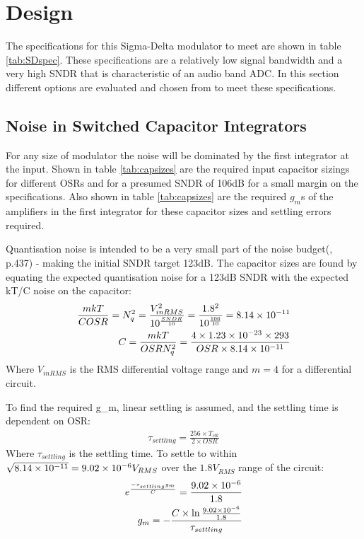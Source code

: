 \section{Design}
\label{Design}
The specifications for this Sigma-Delta modulator to meet are shown in table \ref{tab:SDspec}.
These specifications are a relatively low signal bandwidth and a very high SNDR that is characteristic of an audio band ADC.
In this section different options are evaluated and chosen from to meet these specifications.



\subsection{Noise in  Switched Capacitor Integrators}
\label{Design:noise}
For any size of modulator the noise will be dominated by the first integrator at the input\cite{Henderson2013}.
Shown in table \ref{tab:capsizes} are the required input capacitor sizings for different OSRs and for a presumed SNDR of 106dB for a small margin on the specifications.
Also shown in table \ref{tab:capsizes} are the required $g_{m}$s of the amplifiers in the first integrator for these capacitor sizes and settling errors required.

Quantisation noise is intended to be a very small part of the noise budget(\cite{Steensgaard2004}, p.437) - making the initial SNDR target 123dB.
The capacitor sizes are found by equating the expected quantisation noise for a 123dB SNDR with the expected kT/C noise on the capacitor:
\begin{align}
    \frac{m k T}{C OSR} = N_{q}^{2} = \frac{V_{inRMS}^{2}}{10^{\frac{SNDR}{10}}} = \frac{1.8^{2}}{10^{\frac{106}{10}}} = 8.14\times 10^{-11} \\
    C = \frac{m k T}{OSR N_{q}^{2}} = \frac{4 \times 1.23\times 10^{-23} \times 293}{OSR \times 8.14\times 10^{-11}} 
\end{align}
Where $V_{inRMS}$ is the RMS differential voltage range and $m=4$ for a differential circuit.

To find the required g_{m}, linear settling is assumed, and the settling time is dependent on OSR:
\begin{align}
    \tau_{settling} = \frac{256\times T_{clk}}{2\times OSR}
\end{align}
Where $\tau_{settling}$ is the settling time.
To settle to within $\sqrt{8.14\times 10^{-11}} = 9.02\times 10^{-6} V_{RMS}$ over the $1.8 V_{RMS}$ range of the circuit:
\begin{align}
    e^{\frac{-\tau_{settling} g_{m}}{C}} = \frac{9.02\times 10^{-6}}{1.8} \\
    g_{m}  = - \frac{C \times \ln{\frac{9.02\ensuremath{\times 10^{-6}}}{1.8}}}{\tau_{settling}}
\end{align}

